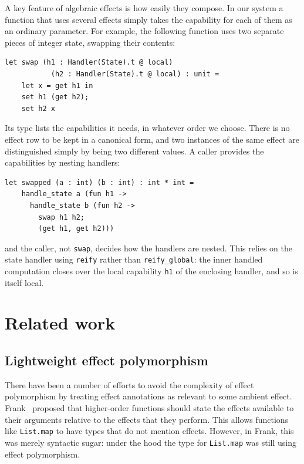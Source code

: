 \documentclass[acmsmall, screen, review, anonymous]{acmart}
\theoremstyle{definition}
\begin{document}
A key feature of algebraic effects is how easily they compose. In our
system a function that uses several effects simply takes the
capability for each of them as an ordinary parameter. For example, the
following function uses two separate pieces of integer state, swapping
their contents:
\begin{lstlisting}[style=oxcaml]
  let swap (h1 : Handler(State).t @ local)
           (h2 : Handler(State).t @ local) : unit =
    let x = get h1 in
    set h1 (get h2);
    set h2 x
\end{lstlisting}
Its type lists the capabilities it needs, in whatever order we
choose. There is no effect row to be kept in a canonical form, and two
instances of the same effect are distinguished simply by being two
different values. A caller provides the capabilities by nesting
handlers:
\begin{lstlisting}[style=oxcaml]
  let swapped (a : int) (b : int) : int * int =
    handle_state a (fun h1 ->
      handle_state b (fun h2 ->
        swap h1 h2;
        (get h1, get h2)))
\end{lstlisting}
and the caller, not \lstinline[style=oxcaml]{swap}, decides how the
handlers are nested. This relies on the state handler using
\lstinline[style=oxcaml]{reify} rather than
\lstinline[style=oxcaml]{reify_global}: the inner handled computation
closes over the local capability \lstinline[style=oxcaml]{h1} of the
enclosing handler, and so is itself local.

\section{Related work}
\label{sec:related-work}

\subsection{Lightweight effect polymorphism}

There have been a number of efforts to avoid the complexity of effect
polymorphism by treating effect annotations as relevant to some ambient
effect. Frank~\cite{convent2020doo} proposed that higher-order functions
should state the effects available to their arguments relative to the
effects that they perform. This allows functions like
\lstinline[style=oxcaml]{List.map} to have types that do not mention
effects. However, in Frank, this was merely syntactic sugar: under the
hood the type for \lstinline[style=oxcaml]{List.map} was still using
effect polymorphism.
\end{document}
